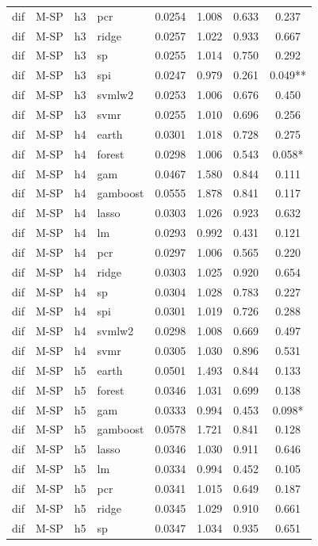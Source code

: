 \begin{ThreePartTable}
\begin{longtable}[t]{llclcccc}
dif & M-SP & h3 & pcr & 0.0254 & 1.008 & 0.633 & 0.237\\
dif & M-SP & h3 & ridge & 0.0257 & 1.022 & 0.933 & 0.667\\
dif & M-SP & h3 & sp & 0.0255 & 1.014 & 0.750 & 0.292\\
dif & M-SP & h3 & spi & 0.0247 & 0.979 & 0.261 & 0.049**\\
dif & M-SP & h3 & svmlw2 & 0.0253 & 1.006 & 0.676 & 0.450\\
dif & M-SP & h3 & svmr & 0.0255 & 1.010 & 0.696 & 0.256\\
\addlinespace
dif & M-SP & h4 & earth & 0.0301 & 1.018 & 0.728 & 0.275\\
dif & M-SP & h4 & forest & 0.0298 & 1.006 & 0.543 & 0.058*\\
dif & M-SP & h4 & gam & 0.0467 & 1.580 & 0.844 & 0.111\\
dif & M-SP & h4 & gamboost & 0.0555 & 1.878 & 0.841 & 0.117\\
dif & M-SP & h4 & lasso & 0.0303 & 1.026 & 0.923 & 0.632\\
dif & M-SP & h4 & lm & 0.0293 & 0.992 & 0.431 & 0.121\\
dif & M-SP & h4 & pcr & 0.0297 & 1.006 & 0.565 & 0.220\\
dif & M-SP & h4 & ridge & 0.0303 & 1.025 & 0.920 & 0.654\\
dif & M-SP & h4 & sp & 0.0304 & 1.028 & 0.783 & 0.227\\
dif & M-SP & h4 & spi & 0.0301 & 1.019 & 0.726 & 0.288\\
dif & M-SP & h4 & svmlw2 & 0.0298 & 1.008 & 0.669 & 0.497\\
dif & M-SP & h4 & svmr & 0.0305 & 1.030 & 0.896 & 0.531\\
\addlinespace
dif & M-SP & h5 & earth & 0.0501 & 1.493 & 0.844 & 0.133\\
dif & M-SP & h5 & forest & 0.0346 & 1.031 & 0.699 & 0.138\\
dif & M-SP & h5 & gam & 0.0333 & 0.994 & 0.453 & 0.098*\\
dif & M-SP & h5 & gamboost & 0.0578 & 1.721 & 0.841 & 0.128\\
dif & M-SP & h5 & lasso & 0.0346 & 1.030 & 0.911 & 0.646\\
dif & M-SP & h5 & lm & 0.0334 & 0.994 & 0.452 & 0.105\\
dif & M-SP & h5 & pcr & 0.0341 & 1.015 & 0.649 & 0.187\\
dif & M-SP & h5 & ridge & 0.0345 & 1.029 & 0.910 & 0.661\\
dif & M-SP & h5 & sp & 0.0347 & 1.034 & 0.935 & 0.651\\

\end{longtable}
\end{ThreePartTable}
